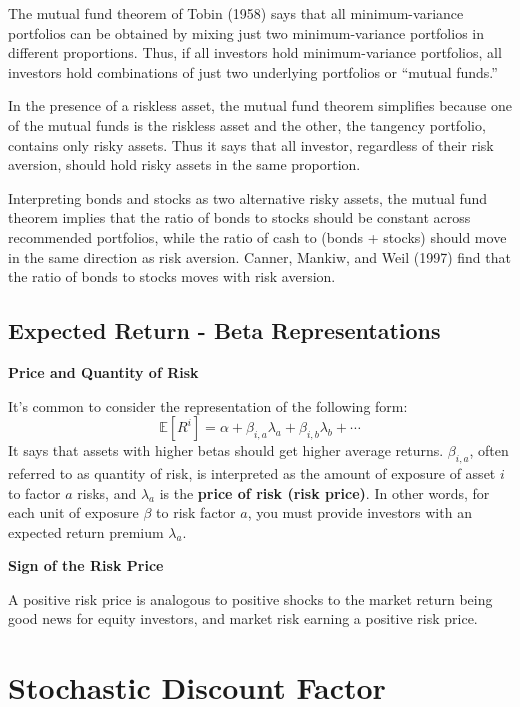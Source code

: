 \documentclass[
]{book}
\begin{document}
The mutual fund theorem of Tobin (1958) says that all minimum-variance portfolios can be obtained by mixing just two minimum-variance portfolios in different proportions. Thus, if all investors hold minimum-variance portfolios, all investors hold combinations of just two underlying portfolios or ``mutual funds.''

In the presence of a riskless asset, the mutual fund theorem simplifies because one of the mutual funds is the riskless asset and the other, the tangency portfolio, contains only risky assets. Thus it says that all investor, regardless of their risk aversion, should hold risky assets in the same proportion.

Interpreting bonds and stocks as two alternative risky assets, the mutual fund theorem implies that the ratio of bonds to stocks should be constant across recommended portfolios, while the ratio of cash to (bonds + stocks) should move in the same direction as risk aversion. Canner, Mankiw, and Weil (1997) find that the ratio of bonds to stocks moves with risk aversion.

\hypertarget{expected-return---beta-representations}{%
\section{Expected Return - Beta Representations}\label{expected-return---beta-representations}}

\textbf{Price and Quantity of Risk}

It's common to consider the representation of the following form:
\[
\mathbb{E}[R^i] = \alpha + \beta_{i,a}\lambda_a + \beta_{i,b}\lambda_b +\cdots
\]
It says that assets with higher betas should get higher average returns. \(\beta_{i,a}\), often referred to as quantity of risk, is interpreted as the amount of exposure of asset \(i\) to factor \(a\) risks, and \(\lambda_a\) is the \textbf{price of risk (risk price)}. In other words, for each unit of exposure \(\beta\) to risk factor \(a\), you must provide investors with an expected return premium \(\lambda_a\).

\textbf{Sign of the Risk Price}

A positive risk price is analogous to positive shocks to the market return being good news for equity investors, and market risk earning a positive risk price.

\hypertarget{stochastic-discount-factor}{%
\chapter{Stochastic Discount Factor}\label{stochastic-discount-factor}}
\end{document}
